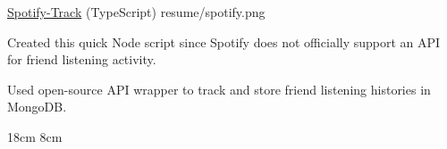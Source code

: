 \begin{cventries}
  \portfolioEntry
    {\href{https://github.com/danielq987/spotify-track}{Spotify-Track} (TypeScript)} %
    {resume/spotify.png} %
    {
      \begin{cvitems} %
        \item {Created this quick Node script since Spotify does not officially support an API for friend listening activity.}
        \item {Used open-source API wrapper to track and store friend listening histories in MongoDB.}
      \end{cvitems}
    }
    {18cm}
    {8cm}

\end{cventries}
